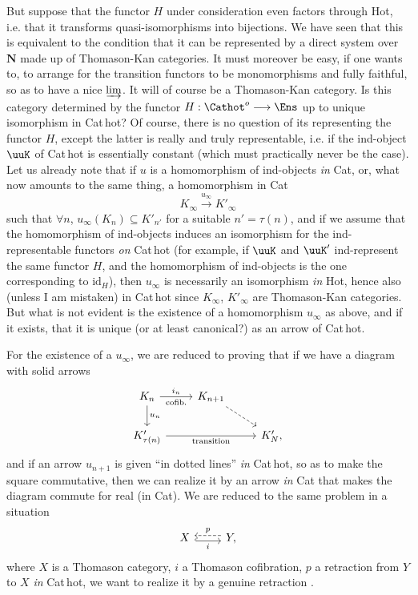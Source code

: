 But suppose that the functor $H$ under consideration even factors through Hot, i.e. that it transforms quasi-isomorphisms into bijections. We have seen that this is equivalent to the condition that it can be represented by a direct system over $\mathbf{N}$ made up of Thomason-Kan categories. It must moreover be easy, if one wants to, to arrange for the transition functors to be monomorphisms and fully faithful, so as to have a nice $\varinjlim$. It will of course be a Thomason-Kan category. Is this category determined by the functor $H : \Cathot^{o} \longrightarrow \Ens$ up to unique isomorphism in Cat\,hot? Of course, there is no question of its representing the functor $H$, except the latter is really and truly representable, i.e. if the ind-object $\uuK$ of Cat\,hot is essentially constant (which must practically never be the case). Let us already note
that if $u$ is a homomorphism of ind-objects \textit{in} Cat, or, what now amounts to the same thing, a homomorphism in Cat %
\[
K_\infty \xrightarrow{u_\infty} K'_\infty
\]
such that $\forall n$, $u_\infty(K_n) \subseteq K'_{n'}$ for a suitable $n' = \tau(n)$, and if we assume that the homomorphism of ind-objects induces an isomorphism for the ind-representable functors \textit{on} Cat\,hot (for example, if $\uuK$ and $\uuK'$ ind-represent the same functor $H$, and the homomorphism of ind-objects is the one corresponding to $\mathrm{id}_H$), then $u_\infty$ is necessarily an isomorphism \textit{in} Hot, hence also (unless I am mistaken) in Cat\,hot since $K_\infty$, $K'_\infty$ are Thomason-Kan categories. But what is not evident is the existence of a homomorphism $u_\infty$ as above, and if it exists, that it is unique (or at least canonical?) as an arrow of Cat\,hot.

For the existence of a $u_\infty$, we are reduced to proving that if we have a diagram with solid arrows
\[
\begin{tikzcd}
K_n \arrow[r, "i_n", "\text{cofib.}"'] \arrow[d, "u_n"] & K_{n+1} \arrow[dr, dashed] & \\
K'_{\tau(n)} \arrow[rr, "\text{transition}"'] & & K'_N ,
\end{tikzcd}
\]
and if an arrow $u_{n+1}$ is given ``in dotted lines'' \textit{in} Cat\,hot, so as to make the square commutative,
then we can realize it by an arrow \textit{in} Cat that makes the diagram commute for real (in Cat). We are reduced to the same problem in a situation
\[
\begin{tikzcd}
X \arrow[r, hook, shift right, "i"'] & Y , \arrow[l, dashed, shift right, "p"']
\end{tikzcd}
\]
where $X$ is a Thomason category, $i$ a Thomason cofibration, $p$ a retraction from $Y$ to $X$ \textit{in} Cat\,hot, we want to realize it by a genuine retraction .

